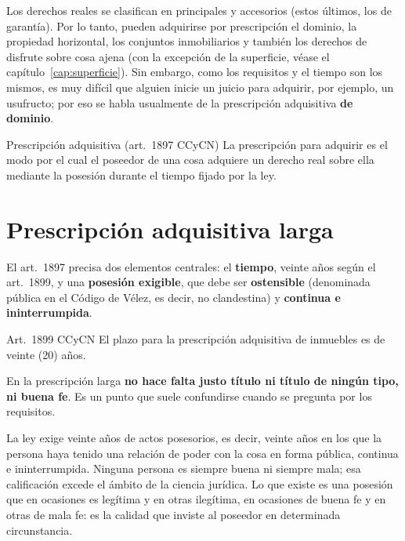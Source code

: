 \documentclass[12pt,oneside]{book}
\begin{document}
Los derechos reales se clasifican en principales y accesorios (estos últimos, los de garantía). Por lo tanto, pueden adquirirse por prescripción el dominio, la propiedad horizontal, los conjuntos inmobiliarios y también los derechos de disfrute sobre cosa ajena (con la excepción de la superficie, véase el capítulo~\ref{cap:superficie}). Sin embargo, como los requisitos y el tiempo son los mismos, es muy difícil que alguien inicie un juicio para adquirir, por ejemplo, un usufructo; por eso se habla usualmente de la prescripción adquisitiva \textbf{de dominio}.

\begin{definicion}{Prescripción adquisitiva (art.~1897 CCyCN)}
La prescripción para adquirir es el modo por el cual el poseedor de una cosa adquiere un derecho real sobre ella mediante la posesión durante el tiempo fijado por la ley.
\end{definicion}

\section{Prescripción adquisitiva larga}

El art.~1897 precisa dos elementos centrales: el \textbf{tiempo}, veinte años según el art.~1899, y una \textbf{posesión exigible}, que debe ser \textbf{ostensible} (denominada pública en el Código de Vélez, es decir, no clandestina) y \textbf{continua e ininterrumpida}.

\begin{regla}{Art.~1899 CCyCN}
El plazo para la prescripción adquisitiva de inmuebles es de veinte (20) años.
\end{regla}

\begin{importante}
En la prescripción larga \textbf{no hace falta justo título ni título de ningún tipo, ni buena fe}. Es un punto que suele confundirse cuando se pregunta por los requisitos.
\end{importante}

La ley exige veinte años de actos posesorios, es decir, veinte años en los que la persona haya tenido una relación de poder con la cosa en forma pública, continua e ininterrumpida. Ninguna persona es siempre buena ni siempre mala; esa calificación excede el ámbito de la ciencia jurídica. Lo que existe es una posesión que en ocasiones es legítima y en otras ilegítima, en ocasiones de buena fe y en otras de mala fe: es la calidad que inviste al poseedor en determinada circunstancia.
\end{document}
